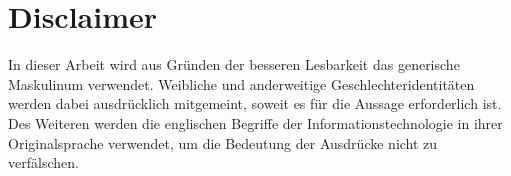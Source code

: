\chapter*{Disclaimer}

In dieser Arbeit wird aus Gründen der besseren Lesbarkeit das generische Maskulinum verwendet. Weibliche und anderweitige Geschlechteridentitäten werden dabei ausdrücklich mitgemeint, soweit es für die Aussage erforderlich ist. Des Weiteren werden die englischen Begriffe der Informationstechnologie in ihrer Originalsprache verwendet, um die Bedeutung der Ausdrücke nicht zu verfälschen.
\pagebreak